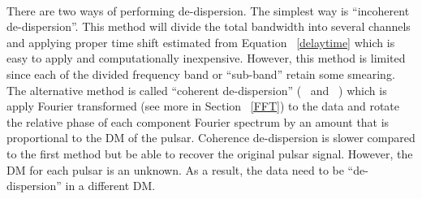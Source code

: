 \documentclass[thesis_msc.tex]{subfiles}
\begin{document}
       \paragraph{} There are two ways of performing de-dispersion. The simplest way is ``incoherent de-dispersion''. This method will divide the total bandwidth into several channels and applying proper time shift estimated from Equation ~\ref{delaytime} which is easy to apply and computationally inexpensive. However, this method is limited since each of the divided frequency band or ``sub-band'' retain some smearing. The alternative method is called ``coherent de-dispersion'' (~\citep{hankins1971microsecond} and ~\citep{hankins1975methods}) which is apply Fourier transformed (see more in Section ~\ref{FFT}) to the data and rotate the relative phase of each component Fourier spectrum by an amount that is proportional to the DM of the pulsar. Coherence de-dispersion is slower compared to the first method but be able to recover the original pulsar signal.      However, the DM for each pulsar is an unknown. As a result, the data need to be ``de-dispersion'' in a different DM. 
\end{document}
